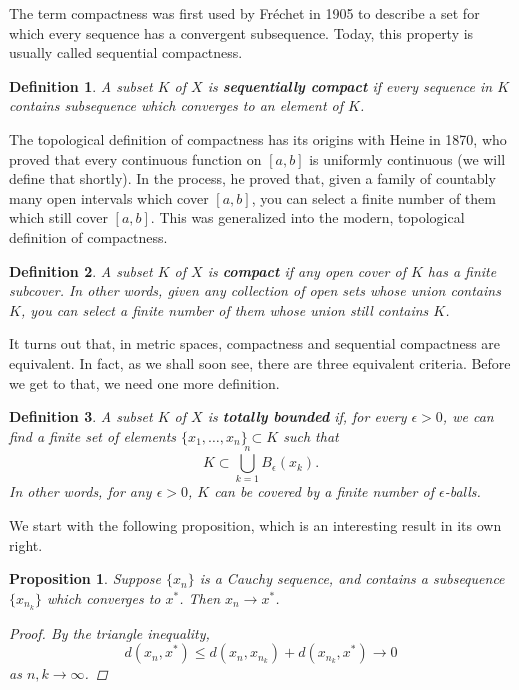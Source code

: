 \documentclass[12pt]{amsart}         %
\newtheorem{definition}{Definition}[section]
\newtheorem{proposition}{Proposition}[section]
\theoremstyle{remark}
\begin{document}
The term compactness was first used by Fr\'echet in 1905 to describe a set for which every sequence has a convergent subsequence. Today, this property is usually called sequential compactness.

\begin{definition}
A subset $K$ of $X$ is \textbf{sequentially compact} if every sequence in $K$ contains subsequence which converges to an element of $K$.
\end{definition}

The topological definition of compactness has its origins with Heine in 1870, who proved that every continuous function on $[a,b]$ is uniformly continuous (we will define that shortly). In the process, he proved that, given a family of countably many open intervals which cover $[a, b]$, you can select a finite number of them which still cover $[a, b]$. This was generalized into the modern, topological definition of compactness.

\begin{definition}
A subset $K$ of $X$ is \textbf{compact} if any open cover of $K$ has a finite subcover. In other words, given any collection of open sets whose union contains $K$, you can select a finite number of them whose union still contains $K$.
\end{definition}

It turns out that, in metric spaces, compactness and sequential compactness are equivalent. In fact, as we shall soon see, there are three equivalent criteria. Before we get to that, we need one more definition.

\begin{definition}
A subset $K$ of $X$ is \textbf{totally bounded} if, for every $\epsilon > 0$, we can find a finite set of elements $\{ x_1, \dots, x_n \} \subset K$ such that 
\[
K \subset \bigcup_{k=1}^n B_\epsilon(x_k).
\]
In other words, for any $\epsilon > 0$, $K$ can be covered by a finite number of $\epsilon$-balls.
\end{definition}

We start with the following proposition, which is an interesting result in its own right.

\begin{proposition}
Suppose $\{x_n\}$ is a Cauchy sequence, and contains a subsequence $\{x_{n_k} \}$ which converges to $x^*$. Then $x_n \rightarrow x^*$.
\begin{proof}
By the triangle inequality,
\[
d(x_n, x^*) \leq d(x_n, x_{n_k}) + d(x_{n_k}, x^*) \rightarrow 0
\]
as $n, k \rightarrow \infty$.
\end{proof}
\end{proposition}
\end{document}
